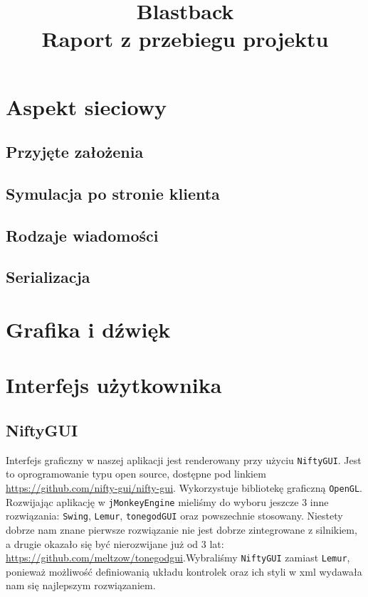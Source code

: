 \documentclass[]{report}
\newcommand{\code}[1]{\colorbox{codegray}{\texttt{#1}}}
\newcommand{\link}[1]{{\color{blue}\href{#1}{#1}}}
\begin{document}
\title{Blastback \\
	\Large Raport z przebiegu projektu}
\maketitle



\chapter*{Aspekt sieciowy}
\section{Przyjęte założenia}
\section{Symulacja po stronie klienta}
\section{Rodzaje wiadomości}
\section{Serializacja}



\chapter*{Grafika i dźwięk}



\chapter*{Interfejs użytkownika}
\section{NiftyGUI}
Interfejs graficzny w naszej aplikacji jest renderowany przy użyciu \code{NiftyGUI}. Jest to oprogramowanie typu open source, dostępne pod linkiem \link{https://github.com/nifty-gui/nifty-gui}. Wykorzystuje bibliotekę graficzną \code{OpenGL}. Rozwijając aplikację w \code{jMonkeyEngine} mieliśmy do wyboru jeszcze 3 inne rozwiązania: \code{Swing}, \code{Lemur}, \code{tonegodGUI} oraz powszechnie stosowany. Niestety dobrze nam znane pierwsze rozwiązanie nie jest dobrze zintegrowane z silnikiem, a drugie okazało się być nierozwijane już od 3 lat: \link{https://github.com/meltzow/tonegodgui}.Wybraliśmy \code{NiftyGUI} zamiast \code{Lemur}, ponieważ możliwość definiowanią układu kontrolek oraz ich styli w xml wydawała nam się najlepszym rozwiązaniem.
\end{document}
